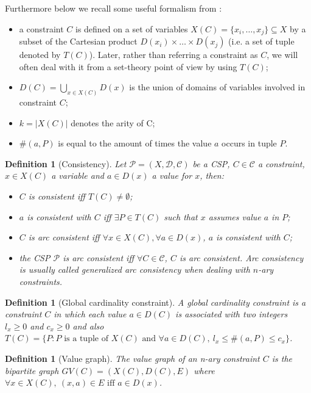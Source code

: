 \documentclass[a4paper,12pt]{article}
\theoremstyle{newplanestyle}
\theoremstyle{newdefinitionstyle}
\newtheorem{newdef}[newtheo]{Definition}
\theoremstyle{newprovestyle}
\begin{document}
\noindent
Furthermore below we recall some useful formalism from \cite{Regin:1996:GAC:1892875.1892906}:
\begin{itemize}
	\item a constraint $C$ is defined on a set of variables $X(C) = \{x_i, \dots, x_j\} \subseteq X$ by a subset of the Cartesian product $D(x_i) \times \dots \times D(x_j)$ (i.e. a set of tuple denoted by $T(C)$). Later, rather than referring a constraint as $C$, we will often deal with it from a set-theory point of view by using $T(C)$;
	\item $D(C) = \bigcup_{x \in X(C)} D(x)$ is the union of domains of variables involved in constraint $C$;
	\item $k=|X(C)|$ denotes the arity of C;
	\item $\#(a,P)$ is equal to the amount of times the value $a$ occurs in tuple $P$.
\end{itemize}

\begin{newdef}[Consistency]
	Let $\mathcal{P} = (X, \mathcal{D}, \mathcal{C})$ be a CSP, $C \in \mathcal{C}$ a constraint, $x \in X(C)$ a variable and $a \in D(x)$ a value for $x$, then:
	\begin{itemize}[noitemsep]
		\item $C$ is \textit{consistent} iff $T(C) \neq \emptyset$;
		\item $a$ is \textit{consistent with $C$} iff $\exists P \in T(C)$ such that $x$ assumes value $a$ in $P$;
		\item $C$ is \textit{arc consistent} iff $\forall x \in X(C), \forall a \in D(x)$, $a$ is consistent with $C$;  
		\item the CSP $\mathcal{P}$ is \textit{arc consistent} iff $\forall C \in \mathcal{C}$, $C$ is arc consistent. Arc consistency is usually called \textit{generalized arc consistency} when dealing with $n$-ary constraints. 
	\end{itemize}
\end{newdef}

\begin{newdef}[Global cardinality constraint]
	A \textit{global cardinality constraint} is a constraint $C$ in which each value $a \in D(C)$ is associated with two integers $l_x \geq 0$ and $c_x \geq 0$ and also $T(C) = \{P : P \text{ is a tuple of } X(C) \text{ and } \forall a \in D(C),\ l_x \leq \#(a, P) \leq c_x \}$.
\end{newdef}

\begin{newdef}[Value graph]
	The \textit{value graph} of an \textit{n}-ary constraint $C$ is the bipartite graph $GV(C) = (X(C), D(C), E)$ where $\forall x \in X(C),\ (x,a) \in E \text{ iff } a \in D(x)$.
\end{newdef}
\end{document}
